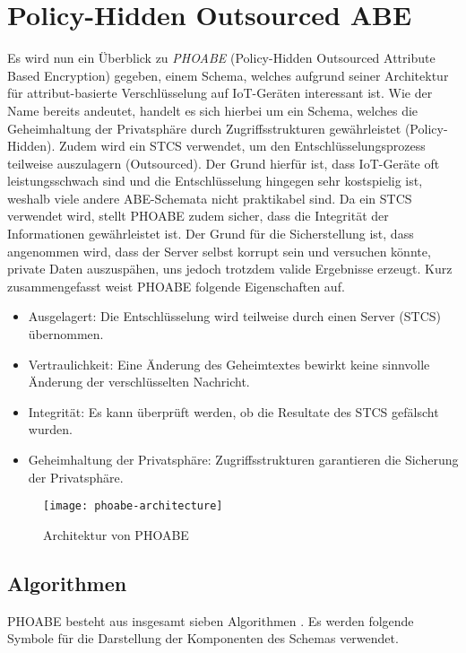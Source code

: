\section{Policy-Hidden Outsourced ABE}
Es wird nun ein Überblick zu \textit{PHOABE} (Policy-Hidden Outsourced
Attribute Based Encryption) gegeben, einem Schema, welches aufgrund seiner
Architektur für attribut-basierte Verschlüsselung auf IoT-Geräten interessant
ist. Wie der Name bereits andeutet, handelt es sich hierbei um ein Schema,
welches die Geheimhaltung der Privatsphäre durch Zugriffsstrukturen
gewährleistet (Policy-Hidden). Zudem wird ein STCS verwendet, um den
Entschlüsselungsprozess teilweise auszulagern (Outsourced). Der Grund hierfür
ist, dass IoT-Geräte oft leistungsschwach sind und die Entschlüsselung
hingegen sehr kostspielig ist, weshalb viele andere ABE-Schemata nicht
praktikabel sind. Da ein STCS verwendet wird, stellt PHOABE zudem sicher, dass
die Integrität der Informationen gewährleistet ist. Der Grund für die
Sicherstellung ist, dass angenommen wird, dass der Server selbst korrupt sein
und versuchen könnte, private Daten auszuspähen, uns jedoch trotzdem valide
Ergebnisse erzeugt. Kurz zusammengefasst weist PHOABE folgende Eigenschaften
auf.

\begin{itemize}
	\item Ausgelagert: Die Entschlüsselung wird teilweise durch einen Server
		(STCS) übernommen.
	\item Vertraulichkeit: Eine Änderung des Geheimtextes bewirkt keine
		sinnvolle Änderung der verschlüsselten Nachricht.
	\item Integrität: Es kann überprüft werden, ob die Resultate des STCS
		ge\-fälscht wurden.
	\item Geheimhaltung der Privatsphäre: Zugriffsstrukturen garantieren die
		Sicherung der Privatsphäre.
\end{itemize}

\begin{figure}
	\centering
	\texttt{[image: phoabe-architecture]}
	\caption{Architektur von PHOABE \cite{phoabe}}
\end{figure}

\subsection{Algorithmen}
PHOABE besteht aus insgesamt sieben Algorithmen \cite{phoabe}. Es werden
folgende Symbole für die Darstellung der Komponenten des Schemas verwendet.

